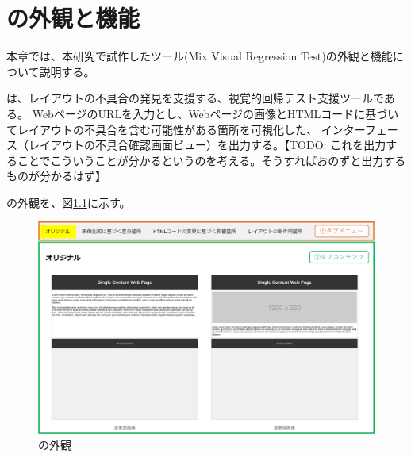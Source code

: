 \chapter{ \toolName の外観と機能}\label{cha:Function}
本章では、本研究で試作したツール\toolName (Mix Visual Regression Test)の外観と機能について説明する。
\par
\toolName は、レイアウトの不具合の発見を支援する、視覚的回帰テスト支援ツールである。
WebページのURLを入力とし、Webページの画像とHTMLコードに基づいてレイアウトの不具合を含む可能性がある箇所を可視化した、
インターフェース（レイアウトの不具合確認画面ビュー）を出力する。【TODO: これを出力することでこういうことが分かるというのを考える。そうすればおのずと出力するものが分かるはず】
\par
\toolName の外観を、図\ref{fig: Appearance}に示す。
\begin{figure}[tp]
    \begin{center}
        \includegraphics[width=1.0\columnwidth]{image/3_Outline_Appearance.png}
        \caption{\toolName の外観}
        \label{fig: Appearance}
    \end{center}
\end{figure}
